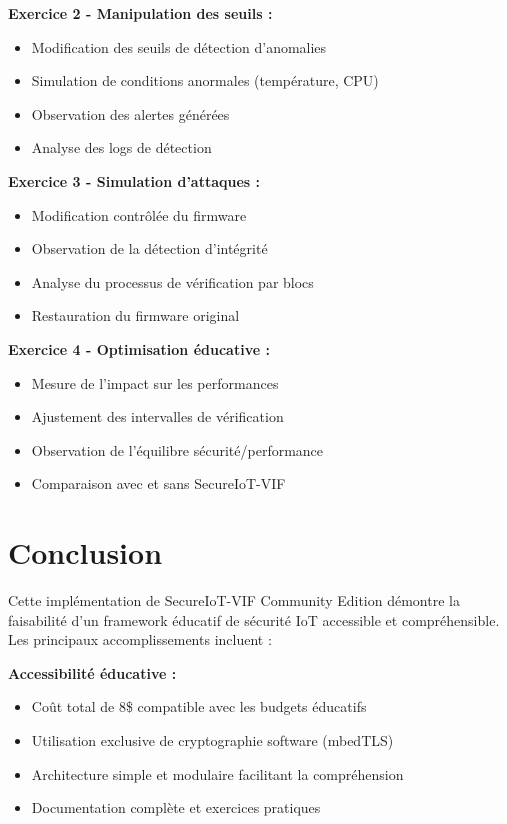 \textbf{Exercice 2 - Manipulation des seuils :}
\begin{itemize}
    \item Modification des seuils de détection d'anomalies
    \item Simulation de conditions anormales (température, CPU)
    \item Observation des alertes générées
    \item Analyse des logs de détection
\end{itemize}

\textbf{Exercice 3 - Simulation d'attaques :}
\begin{itemize}
    \item Modification contrôlée du firmware
    \item Observation de la détection d'intégrité
    \item Analyse du processus de vérification par blocs
    \item Restauration du firmware original
\end{itemize}

\textbf{Exercice 4 - Optimisation éducative :}
\begin{itemize}
    \item Mesure de l'impact sur les performances
    \item Ajustement des intervalles de vérification
    \item Observation de l'équilibre sécurité/performance
    \item Comparaison avec et sans SecureIoT-VIF
\end{itemize}

\section{Conclusion}

Cette implémentation de SecureIoT-VIF Community Edition démontre la faisabilité d'un framework éducatif de sécurité IoT accessible et compréhensible. Les principaux accomplissements incluent :

\textbf{Accessibilité éducative :}
\begin{itemize}
    \item Coût total de 8\$ compatible avec les budgets éducatifs
    \item Utilisation exclusive de cryptographie software (mbedTLS)
    \item Architecture simple et modulaire facilitant la compréhension
    \item Documentation complète et exercices pratiques
\end{itemize}


